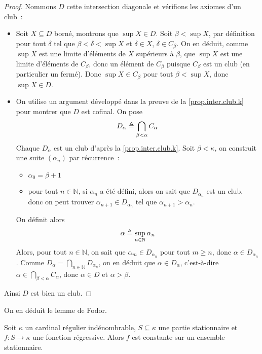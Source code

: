 \begin{proof}
  Nommons $D$ cette intersection diagonale et vérifions les axiomes d'un club~:
  \begin{itemize}
  \item Soit $X\subseteq D$ borné, montrons que $\sup X \in D$. Soit
    $\beta < \sup X$, par définition pour tout $\delta$ tel que
    $\beta<\delta<\sup X$ et $\delta \in X$, $\delta \in C_\beta$. On en déduit,
    comme $\sup X$ est une limite d'éléments de $X$ supérieurs à $\beta$,
    que $\sup X$ est une limite d'éléments de $C_\beta$, donc un élément de
    $C_\beta$ puisque $C_\beta$ est un club (en particulier un fermé). Donc
    $\sup X\in C_\beta$ pour tout $\beta < \sup X$, donc $\sup X \in D$.
  \item On utilise un argument développé dans la preuve de la
    \cref{prop.inter.club.k} pour montrer que $D$ est cofinal. On pose
    \[D_\alpha \triangleq \bigcap_{\beta < \alpha} C_\alpha\]
    Chaque $D_\alpha$ est un club d'après la \cref{prop.inter.club.k}.
    Soit $\beta < \kappa$, on construit une suite $(\alpha_n)$ par
    récurrence~:
    \begin{itemize}
    \item $\alpha_0 = \beta + 1$
    \item pour tout $n \in \mathbb N$, si $\alpha_n$ a été défini, alors on
      sait que $D_{\alpha_n}$ est un club, donc on peut trouver
      $\alpha_{n+1}\in D_{\alpha_n}$ tel que $\alpha_{n+1} > \alpha_n$.
    \end{itemize}
    On définit alors
    \[\alpha \triangleq \sup_{n \in \mathbb N} \alpha_n\]
    Alors, pour tout $n \in \mathbb N$, on sait que $\alpha_m \in D_{\alpha_n}$
    pour tout $m \geq n$, donc $\alpha \in D_{\alpha_n}$. Comme
    $\displaystyle D_{\alpha} =\bigcap_{n \in \mathbb N} D_{\alpha_n}$,
    on en déduit que $\alpha \in D_\alpha$, c'est-à-dire
    $\alpha \in \bigcap_{\beta < \alpha} C_\alpha$, donc
    $\alpha \in D$ et $\alpha > \beta$.
  \end{itemize}
  Ainsi $D$ est bien un club.
\end{proof}

On en déduit le lemme de Fodor.

\begin{lemma}
  Soit $\kappa$ un cardinal régulier indénombrable, $S \subseteq \kappa$ une
  partie stationnaire et $f : S \to \kappa$ une fonction régressive. Alors
  $f$ est constante sur un ensemble stationnaire.
\end{lemma}

